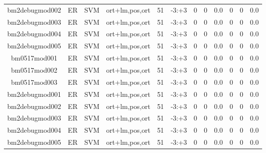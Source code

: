 \documentclass[a4paper]{article}
\begin{document}
\begin{landscape}
\begin{center}
\begin{tabular}{ |c|c|c|c|c|c|c|c|c|c|c|c|}
 
 	
 	\small{ bm2debugmod002 } & ER & SVM & ort+lm,pos,ort  &  51 &  -3:+3  &  0 & 0 & 0.0  &  0 & 0 & 0.0 \\
 	

 
 	
 	\small{ bm2debugmod003 } & ER & SVM & ort+lm,pos,ort  &  51 &  -3:+3  &  0 & 0 & 0.0  &  0 & 0 & 0.0 \\
 	

 
 	
 	\small{ bm2debugmod004 } & ER & SVM & ort+lm,pos,ort  &  51 &  -3:+3  &  0 & 0 & 0.0  &  0 & 0 & 0.0 \\
 	

 
 	
 	\small{ bm2debugmod005 } & ER & SVM & ort+lm,pos,ort  &  51 &  -3:+3  &  0 & 0 & 0.0  &  0 & 0 & 0.0 \\
 	

 
 	
 	\small{ bm0517mod001 } & ER & SVM & ort+lm,pos,ort  &  51 &  -3:+3  &  0 & 0 & 0.0  &  0 & 0 & 0.0 \\
 	

 
 	
 	\small{ bm0517mod002 } & ER & SVM & ort+lm,pos,ort  &  51 &  -3:+3  &  0 & 0 & 0.0  &  0 & 0 & 0.0 \\
 	

 
 	
 	\small{ bm0517mod003 } & ER & SVM & ort+lm,pos,ort  &  51 &  -3:+3  &  0 & 0 & 0.0  &  0 & 0 & 0.0 \\
 	

 
 	
 	\small{ bm2debugmod001 } & ER & SVM & ort+lm,pos,ort  &  51 &  -3:+3  &  0 & 0 & 0.0  &  0 & 0 & 0.0 \\
 	

 
 	
 	\small{ bm2debugmod002 } & ER & SVM & ort+lm,pos,ort  &  51 &  -3:+3  &  0 & 0 & 0.0  &  0 & 0 & 0.0 \\
 	

 
 	
 	\small{ bm2debugmod003 } & ER & SVM & ort+lm,pos,ort  &  51 &  -3:+3  &  0 & 0 & 0.0  &  0 & 0 & 0.0 \\
 	

 
 	
 	\small{ bm2debugmod004 } & ER & SVM & ort+lm,pos,ort  &  51 &  -3:+3  &  0 & 0 & 0.0  &  0 & 0 & 0.0 \\
 	

 
 	
 	\small{ bm2debugmod005 } & ER & SVM & ort+lm,pos,ort  &  51 &  -3:+3  &  0 & 0 & 0.0  &  0 & 0 & 0.0 \\
 	


\end{tabular}
\end{center}
\end{landscape}
\end{document}
